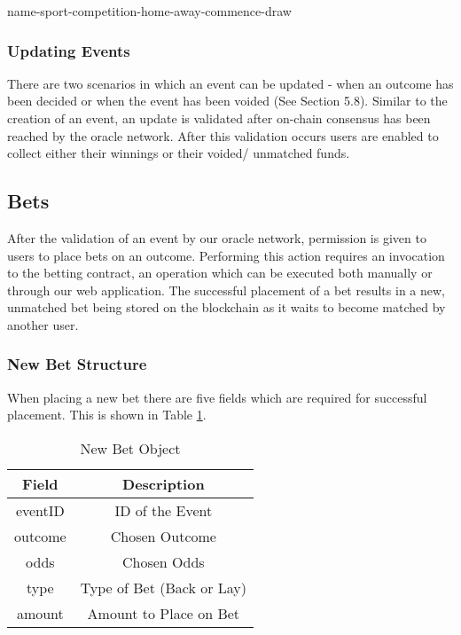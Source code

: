 \documentclass{article}
\begin{document}
\begin{center}
name-sport-competition-home-away-commence-draw
\end{center}
	
		\subsubsection{Updating Events}
There are two scenarios in which an event can be updated - when an outcome has been decided or when the event has been voided (See Section 5.8). Similar to the creation of an event, an update is validated after on-chain consensus has been reached by the oracle network. After this validation occurs users are enabled to collect either their winnings or their voided/ unmatched funds.  

	\subsection{Bets}
	After the validation of an event by our oracle network, permission is given to users to place bets on an outcome. Performing this action requires an invocation to the betting contract, an operation which can be executed both manually or through our web application. The successful placement of a bet results in a new, unmatched bet being stored on the blockchain as it waits to become matched by another user.
	
		\subsubsection{New Bet Structure}
When placing a new bet there are five fields which are required for successful placement. This is shown in Table \ref{table:bets}.

\begin{table}[!htb]
\centering
\caption{New Bet Object}

\begin{tabular}{ c c }
\bfseries{Field} & \bfseries{Description} \\
\hline

eventID & ID of the Event \\ 
\hline
outcome & Chosen Outcome \\  
\hline
odds & Chosen Odds \\ 
\hline
type & Type of Bet (Back or Lay) \\ 
\hline
amount & Amount to Place on Bet \\ 
\hline

\end{tabular}
\label{table:bets}
\end{table}
\end{document}
